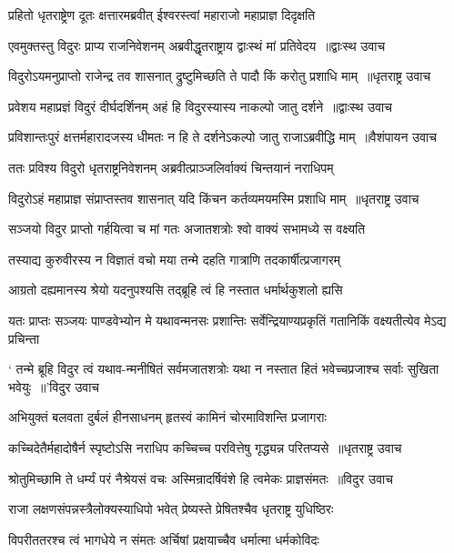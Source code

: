 \twolineshloka
{प्रहितो धृतराष्ट्रेण दूतः क्षत्तारमब्रवीत्}
{ईश्वरस्त्वां महाराजो महाप्राज्ञ दिदृक्षति}


\threelineshloka
{एवमुक्तस्तु विदुरः प्राप्य राजनिवेशनम्}
{अब्रवीद्धृतराष्ट्राय द्वाःस्थं मां प्रतिवेदय ॥द्वाःस्थ उवाच}
{}


\threelineshloka
{विदुरोऽयमनुप्राप्तो राजेन्द्र तव शासनात्}
{द्रुष्टुमिच्छति ते पादौ किं करोतु प्रशाधि माम् ॥धृतराष्ट्र उवाच}
{}


\threelineshloka
{प्रवेशय महाप्रज्ञं विदुरं दीर्घदर्शिनम्}
{अहं हि विदुरस्यास्य नाकल्पो जातु दर्शने ॥द्वाःस्थ उवाच}
{}


\threelineshloka
{प्रविशान्तःपुरं क्षत्तर्महारादजस्य धीमतः}
{न हि ते दर्शनेऽकल्पो जातु राजाऽब्रवीद्धि माम् ॥वैशंपायन उवाच}
{}


\twolineshloka
{ततः प्रविश्य विदुरो धृतराष्ट्रनिवेशनम्}
{अब्रवीत्प्राञ्जलिर्वाक्यं चिन्तयानं नराधिपम्}


\threelineshloka
{विदुरोऽहं महाप्राज्ञ संप्राप्तस्तव शासनात्}
{यदि किंचन कर्तव्यमयमस्मि प्रशाधि माम् ॥धृतराष्ट्र उवाच}
{}


\twolineshloka
{सञ्जयो विदुर प्राप्तो गर्हयित्वा च मां गतः}
{अजातशत्रोः श्वो वाक्यं सभामध्ये स वक्ष्यति}


\twolineshloka
{तस्याद्य कुरुवीरस्य न विज्ञातं वचो मया}
{तन्मे दहति गात्राणि तदकार्षीत्प्रजागरम्}


\twolineshloka
{आग्रतो दह्यमानस्य श्रेयो यदनुपश्यसि}
{तद्ब्रूहि त्वं हि नस्तात धर्मार्थकुशलो ह्यसि}


\twolineshloka
{यतः प्राप्तः सञ्जयः पाण्डवेभ्योन मे यथावन्मनसः प्रशान्तिः}
{सर्वेन्द्रियाण्यप्रकृतिं गतानिकिं वक्ष्यतीत्येव मेऽद्य प्रचिन्ता}


\threelineshloka
{` तन्मे ब्रूहि विदुर त्वं यथाव-न्मनीषितं सर्वमजातशत्रोः}
{यथा न नस्तात हितं भवेच्चप्रजाश्च सर्वाः सुखिता भवेयुः ॥'विदुर उवाच}
{}


\twolineshloka
{अभियुक्तं बलवता दुर्बलं हीनसाधनम्}
{हृतस्वं कामिनं चोरमाविशन्ति प्रजागराः}


\threelineshloka
{कच्चिदेतैर्महादोषैर्न स्पृष्टोऽसि नराधिप}
{कच्चिच्च परवित्तेषु गृद्ध्यन्न परितप्यसे ॥धृतराष्ट्र उवाच}
{}


\threelineshloka
{श्रोतुमिच्छामि ते धर्म्यं परं नैश्रेयसं वचः}
{अस्मिन्रादर्षिवंशे हि त्वमेकः प्राज्ञसंमतः ॥विदुर उवाच}
{}


\twolineshloka
{राजा लक्षणसंपन्नस्त्रैलोक्यस्याधिपो भवेत्}
{प्रेष्यस्ते प्रेषितश्चैव धृतराष्ट्र युधिष्ठिरः}


\twolineshloka
{विपरीततरश्च त्वं भागधेये न संमतः}
{अर्चिषां प्रक्षयाच्चैव धर्मात्मा धर्मकोविदः}


